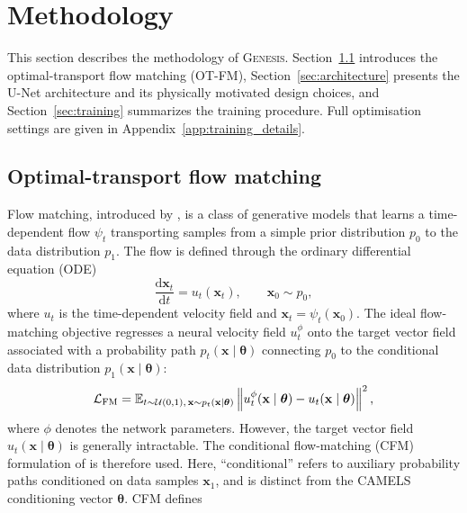 \documentclass{article}
\newcommand{\thetavec}{\boldsymbol{\theta}}
\begin{document}
\section{Methodology}
\label{sec:methods}
This section describes the methodology of \textsc{Genesis}.
Section~\ref{sec:flow_matching} introduces the optimal-transport flow
matching (OT-FM), Section~\ref{sec:architecture} presents
the U-Net architecture and its physically motivated design choices,
and Section~\ref{sec:training} summarizes the training procedure.
Full optimisation settings are given in Appendix~\ref{app:training_details}.

\subsection{Optimal-transport flow matching}
\label{sec:flow_matching}
Flow matching, introduced by \citet{Lipman2023}, is a class of
generative models that learns a time-dependent flow $\psi_t$
transporting samples from a simple prior distribution $p_0$ to the
data distribution $p_1$. The flow is defined through the ordinary
differential equation (ODE)
\begin{equation}
  \frac{\mathrm{d}\mathbf{x}_t}{\mathrm{d}t}
  =
  u_t(\mathbf{x}_t),
  \qquad
  \mathbf{x}_0\sim p_0,
  \label{eq:flow_ode}
\end{equation}
where $u_t$ is the time-dependent velocity field and
$\mathbf{x}_t=\psi_t(\mathbf{x}_0)$.
The ideal flow-matching objective regresses a neural velocity field
$u_t^\phi$ onto the target vector field associated with a probability
path $p_t(\mathbf{x}\mid\thetavec)$ connecting $p_0$ to the conditional
data distribution $p_1(\mathbf{x}\mid\thetavec)$:
\begin{equation}
  \mathcal{L}_{\rm FM} =
  \mathbb{E}_{t\sim\mathcal{U}(0,1),\,
  \mathbf{x}\sim p_t(\mathbf{x}\mid\thetavec)}
  \left\|
    u_t^\phi(\mathbf{x}\mid\thetavec)
    -
    u_t(\mathbf{x}\mid\thetavec)
  \right\|^2 ,
  \label{eq:fm}
\end{equation}
where $\phi$ denotes the network parameters. However, the target vector
field $u_t(\mathbf{x}\mid\thetavec)$ is generally intractable. The
conditional flow-matching (CFM) formulation of \citet{Lipman2023} is
therefore used. Here, ``conditional'' refers to auxiliary
probability paths conditioned on data samples $\mathbf{x}_1$, and is
distinct from the CAMELS conditioning vector $\thetavec$. CFM defines
\end{document}
